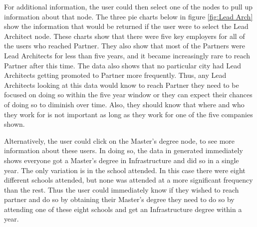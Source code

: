 For additional information, the user could then select one of the nodes to pull
up information about that node.  The three pie charts below in figure
\ref{fig:Lead Arch} show the information that would be returned if the user
were to select the Lead Architect node.  These charts show that there were five
key employers for all of the users who reached Partner.  They also show that
most of the Partners were Lead Architects for less than five years, and it
became increasingly rare to reach Partner after this time.  The data also shows
that no particular city had Lead Architects getting promoted to Partner more
frequently.  Thus, any Lead Architects looking at this data would know to reach
Partner they need to be focused on doing so within the five year window or they
can expect their chances of doing so to diminish over time.  Also, they should
know that where and who they work for is not important as long as they work for
one of the five companies shown.

Alternatively, the user could click on the Master's degree node, to see more
information about these users.  In doing so, the data in generated immediately
shows everyone got a Master's degree in Infrastructure and did so in a single
year.  The only variation is in the school attended.  In this case there were
eight different schools attended, but none was attended at a more significant
frequency than the rest.  Thus the user could immediately know if they wished to
reach partner and do so by obtaining their Master's degree they need to do so by
attending one of these eight schools and get an Infrastructure degree within a
year.


